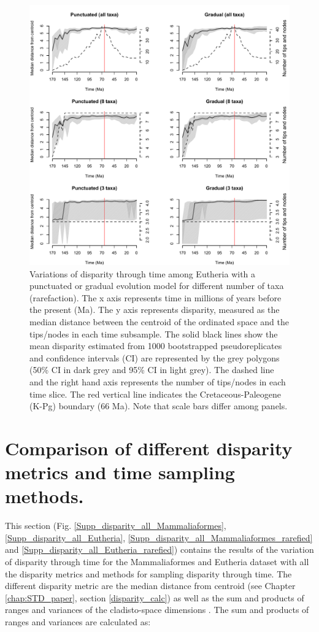 \begin{figure}
\centering
    \includegraphics[keepaspectratio=true]{Supplementaries/Figures/STD/Rarefaction-beck.pdf}
\caption[Eutheria disparity (rarefied)]{Variations of disparity through time among Eutheria with a punctuated or gradual evolution model for different number of taxa (rarefaction). The x axis represents time in millions of years before the present (Ma). The y axis represents disparity, measured as the median distance between the centroid of the ordinated space and the tips/nodes in each time subsample. The solid black lines show the mean disparity estimated from 1000 bootstrapped pseudoreplicates and confidence intervals (CI) are represented by the grey polygons (50\% CI in dark grey and 95\% CI in light grey). The dashed line and the right hand axis represents the number of tips/nodes in each time slice. The red vertical line indicates the Cretaceous-Paleogene (K-Pg) boundary (66 Ma). Note that scale bars differ among panels.}
\label{Supp_Eutheria_rarefied}
\end{figure}

\newpage
\section{Comparison of different disparity metrics and time sampling methods.}
This section (Fig. \ref{Supp_disparity_all_Mammaliaformes}, \ref{Supp_disparity_all_Eutheria}, \ref{Supp_disparity_all_Mammaliaformes_rarefied} and \ref{Supp_disparity_all_Eutheria_rarefied}) contains the results of the variation of disparity through time for the Mammaliaformes and Eutheria dataset with all the disparity metrics and methods for sampling disparity through time.
The different disparity metric are the median distance from centroid (see Chapter \ref{chap:STD_paper}, section \ref{disparity_calc}) as well as the sum and products of ranges and variances of the cladisto-space dimensions \citep{Wills1994}.
The sum and products of ranges and variances are calculated as:

